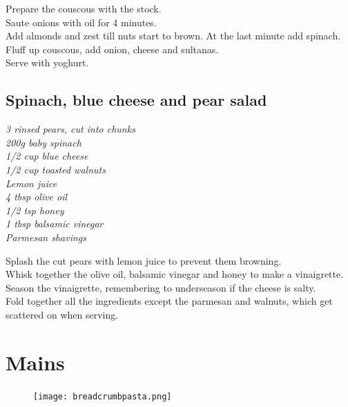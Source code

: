 \documentclass{tufte-book}
\begin{document}
Prepare the couscous with the stock.
\\Saute onions with oil for 4 minutes.
\\Add almonds and zest till nuts start to brown. At the last minute add spinach.
\\Fluff up couscous, add onion, cheese and sultanas.
\\Serve with yoghurt.



\section{Spinach, blue cheese and pear salad}


\emph{3 rinsed pears, cut into chunks
\\200g baby spinach
\\1/2 cup blue cheese
\\1/2 cup toasted walnuts
\\Lemon juice
\\4 tbsp olive oil
\\1/2 tsp honey
\\1 tbsp balsamic vinegar
\\Parmesan shavings
}

Splash the cut pears with lemon juice to prevent them browning.
\\Whisk together the olive oil, balsamic vinegar and honey to make a vinaigrette.
\\Season the vinaigrette, remembering to underseason if the cheese is salty.
\\Fold together all the ingredients except the parmesan and walnuts, which get scattered on when serving.

\chapter{Mains}

\begin{figure}[h]
  \texttt{[image: breadcrumbpasta.png]}
\end{figure}
\end{document}

